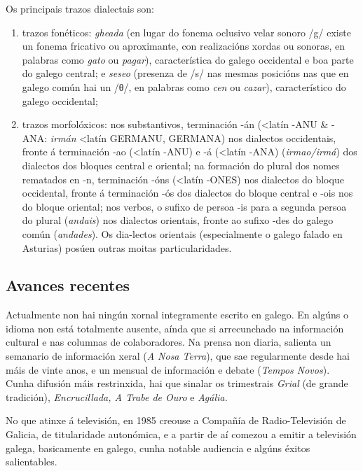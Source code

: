 \begin{multicols}{2}
Os principais trazos dialectais son:
	\begin{enumerate}
	   \item trazos fonéticos: \textit{gheada} (en lugar do fonema oclusivo velar sonoro /g/ existe un fonema fricativo ou aproximante, con realizacións xordas ou sonoras, en palabras como \textit{gato} ou \textit{pagar}), característica do galego occidental e boa parte do galego central; e \textit{seseo} (presenza de /s/ nas mesmas posicións nas que en galego común hai un /θ/, en palabras como \textit{cen} ou \textit{cazar}), característico do galego occidental; 
	   \item trazos morfolóxicos: nos substantivos, terminación -án (<latín -ANU \& -ANA: \textit{irmán} <latín GERMANU, GERMANA) nos dialectos occidentais, fronte á terminación -ao (<latín -ANU) e -á (<latín -ANA) (\textit{irmao/irmá}) dos dialectos dos bloques central e oriental; na formación do plural dos nomes rematados en -n, terminación -óns (<latín -ONES) nos dialectos do bloque occidental, fronte á terminación -ós dos dialectos do bloque central e -ois nos do bloque oriental; nos verbos, o sufixo de persoa -is para a segunda persoa do plural (\textit{andais}) nos dialectos orientais, fronte ao sufixo -des do galego común (\textit{andades}). Os dia-lectos orientais (especialmente o galego falado en Asturias) posúen outras moitas particularidades.
\end{enumerate}

\subsection{Avances recentes}


Actualmente  non hai ningún xornal integramente escrito en galego. En algúns o idioma non está totalmente ausente, aínda que si arrecunchado na información cultural e nas columnas de colaboradores. Na prensa non diaria, salienta un semanario de información xeral (\textit{A Nosa Terra}), que sae regularmente desde hai máis de vinte anos, e un mensual de información e debate (\textit{Tempos Novos}). Cunha difusión máis restrinxida, hai que sinalar os trimestrais \textit{Grial} (de grande tradición), \textit{Encrucillada, A Trabe de Ouro} e \textit{Agália.}

No que atinxe á televisión, en 1985 creouse a Compañía de Radio-Televisión de Galicia, de titularidade autonómica, e a partir de aí comezou a emitir a televisión galega, basicamente en galego, cunha notable audiencia e algúns éxitos salientables. 


\end{multicols}
